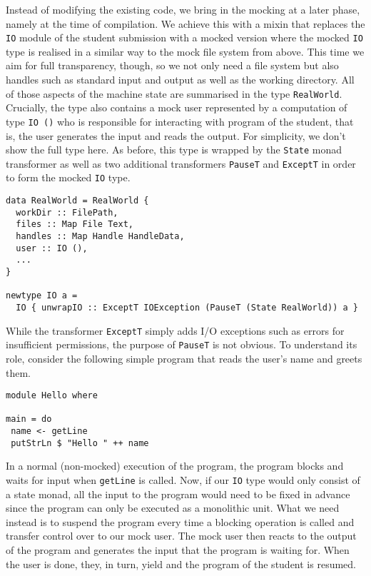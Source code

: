 Instead of modifying the existing code, we bring in the mocking at a later phase, namely at the time of compilation.
We achieve this with a mixin that replaces the \texttt{IO} module of the student submission with a mocked version where the mocked \texttt{IO} type is realised in a similar way to the mock file system from above.
This time we aim for full transparency, though, so we not only need a file system but also handles such as standard input and output as well as the working directory.
All of those aspects of the machine state are summarised in the type \texttt{RealWorld}.
Crucially, the type also contains a mock user represented by a computation of type \texttt{IO ()} who is responsible for interacting with program of the student, that is, the user generates the input and reads the output.
For simplicity, we don't show the full type here.
As before, this type is wrapped by the \texttt{State} monad transformer as well as two additional transformers \texttt{PauseT} and \texttt{ExceptT} in order to form the mocked \texttt{IO} type.
\begin{verbatim}
data RealWorld = RealWorld {
  workDir :: FilePath,
  files :: Map File Text,
  handles :: Map Handle HandleData,
  user :: IO (),
  ...
}

newtype IO a =
  IO { unwrapIO :: ExceptT IOException (PauseT (State RealWorld)) a } 
\end{verbatim}
While the transformer \texttt{ExceptT} simply adds I/O exceptions such as errors for insufficient permissions, the purpose of \texttt{PauseT} is not obvious.
To understand its role, consider the following simple program that reads the user's name and greets them.
\begin{verbatim}
module Hello where

main = do
 name <- getLine
 putStrLn $ "Hello " ++ name
\end{verbatim}
In a normal (non-mocked) execution of the program, the program blocks and waits for input when \texttt{getLine} is called.
Now, if our \texttt{IO} type would only consist of a state monad, all the input to the program would need to be fixed in advance since the program can only be executed as a monolithic unit.
What we need instead is to suspend the program every time a blocking operation is called and transfer control over to our mock user.
The mock user then reacts to the output of the program and generates the input that the program is waiting for.
When the user is done, they, in turn, yield and the program of the student is resumed.

